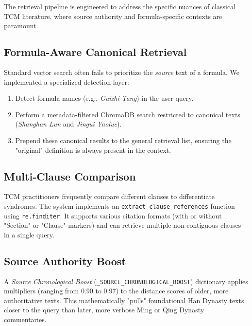 The retrieval pipeline is engineered to address the specific nuances of classical TCM literature, where source authority and formula-specific contexts are paramount.

\subsection{Formula-Aware Canonical Retrieval}
Standard vector search often fails to prioritize the \textit{source} text of a formula. We implemented a specialized detection layer:
\begin{enumerate}
    \item Detect formula names (e.g., \textit{Guizhi Tang}) in the user query.
    \item Perform a metadata-filtered ChromaDB search restricted to canonical texts (\textit{Shanghan Lun} and \textit{Jingui Yaolue}).
    \item Prepend these canonical results to the general retrieval list, ensuring the "original" definition is always present in the context.
\end{enumerate}

\subsection{Multi-Clause Comparison}
TCM practitioners frequently compare different clauses to differentiate syndromes. The system implements an \texttt{extract\_clause\_references} function using \texttt{re.finditer}. It supports various citation formats (with or without "Section" or "Clause" markers) and can retrieve multiple non-contiguous clauses in a single query.

\subsection{Source Authority Boost}
A \textit{Source Chronological Boost} (\texttt{\_SOURCE\_CHRONOLOGICAL\_BOOST}) dictionary applies multipliers (ranging from 0.90 to 0.97) to the distance scores of older, more authoritative texts. This mathematically "pulls" foundational Han Dynasty texts closer to the query than later, more verbose Ming or Qing Dynasty commentaries.


